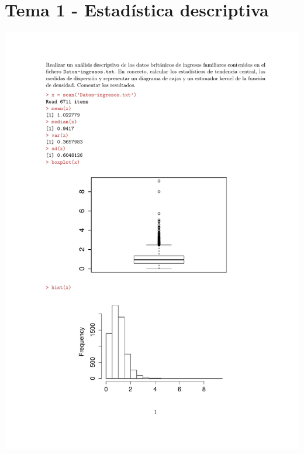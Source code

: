 %
%
%

\newpage
\section{Tema 1 - Estadística descriptiva}

\begin{problem}[1]
\solution
\centerline{\includegraphics[page=1,scale=0.745]{pdf/_Solucion_T1P1.pdf}} %

\end{problem}
\newpage

